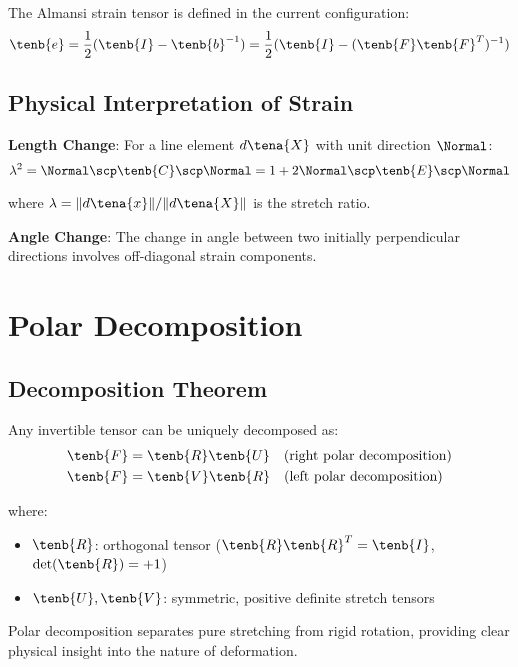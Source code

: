 The Almansi strain tensor is defined in the current configuration:
\begin{equation}
\tenb{e} = \frac{1}{2}(\tenb{I} - \tenb{b}^{-1}) = \frac{1}{2}(\tenb{I} - (\tenb{F}\tenb{F}^T)^{-1})
\end{equation}

\subsection{Physical Interpretation of Strain}

\textbf{Length Change}:
For a line element $d\tena{X}$ with unit direction $\Normal$:
\begin{equation}
\lambda^2 = \Normal \scp \tenb{C} \scp \Normal = 1 + 2\Normal \scp \tenb{E} \scp \Normal
\end{equation}

where $\lambda = \lVert d\tena{x}\rVert/\lVert d\tena{X}\rVert$ is the stretch ratio.

\textbf{Angle Change}:
The change in angle between two initially perpendicular directions involves off-diagonal strain components.

\section{Polar Decomposition}

\subsection{Decomposition Theorem}

Any invertible tensor can be uniquely decomposed as:
\begin{align}
\tenb{F} &= \tenb{R} \tenb{U} \quad \text{(right polar decomposition)} \\
\tenb{F} &= \tenb{V} \tenb{R} \quad \text{(left polar decomposition)}
\end{align}

where:
\begin{itemize}
\item $\tenb{R}$: orthogonal tensor ($\tenb{R}\tenb{R}^T = \tenb{I}$, $\det(\tenb{R}) = +1$)
\item $\tenb{U}, \tenb{V}$: symmetric, positive definite stretch tensors
\end{itemize}

\begin{keypoint}
Polar decomposition separates pure stretching from rigid rotation, providing clear physical insight into the nature of deformation.
\end{keypoint}

